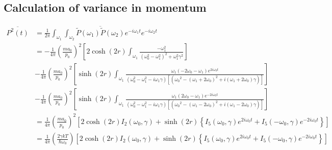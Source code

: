 \documentclass[12pt, twoside]{article}
\begin{document}
\subsection{Calculation of variance in momentum}
$\begin{aligned} \overline{P ^ { 2 } ( t )} &= \frac { 1 } { 2 \pi } \int _ { \omega _ { 1 }}\int_{\omega_2} \overline{\widetilde { P } ( \omega_1 )\widetilde { P } ( \omega_2 )}  e ^ { - i \omega _ { 1 } t } e ^ { - i \omega _ { 2 } t } \\&= -\frac{1}{4\pi}\left(\frac { m a_0 } { p _ { 0 } }\right)^2 \left[ 2 \cosh(2r) \int_{\omega_1} \frac{-\omega_{ 1 }^2}{(\omega_0^2 - \omega_1 ^2)^2 + \omega_1 ^2 \gamma^2}\right] \\&- \frac{1}{4\pi}\left(\frac { m a_0 } { p _ { 0 } }\right)^2 \left[ \sinh(2r) \int_{\omega_1} \frac{\omega_1 (-2\omega_0 - \omega_1)e^{2i\omega_0 t}}{(\omega_0^2 - \omega_1 ^2 - i\omega_1\gamma) [({\omega_0}^2 - (\omega_1 + 2\omega_0)^2 + i(\omega_1 + 2 \omega_0) \gamma)]}\right]
\\&- \frac{1}{4\pi}\left(\frac { m a_0 } { p _ { 0 } }\right)^2 \left[ \sinh(2r) \int_{\omega_1} \frac{\omega_1 (2\omega_0 - \omega_1)e^{-2i\omega_0 t}}{(\omega_0^2 - \omega_1 ^2 - i\omega_1\gamma) [({\omega_0}^2 - (\omega_1 - 2\omega_0)^2 + i(\omega_1 - 2 \omega_0) \gamma)]}\right] \\&= \frac{1}{4\pi}\left(\frac { m a_0 } { p _ { 0 } }\right)^2 \left[2\cosh(2r) I_2(\omega_0,\gamma) + \sinh(2r)\left\{I_5(\omega_0,\gamma)e^{2i\omega_0 t}+I_5(-\omega_0,\gamma)e^{-2i\omega_0 t}\right\} \right] 
\\&= \frac{1}{4\pi}\left(\frac {2\gamma k T } { \hbar \omega_0 }\right) \left[2\cosh(2r) I_2(\omega_0,\gamma) + \sinh(2r)\left\{I_5(\omega_0,\gamma)e^{2i\omega_0 t}+I_5(-\omega_0,\gamma)e^{-2i\omega_0 t}\right\} \right]\end{aligned}$
\end{document}
